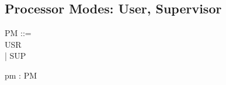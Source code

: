 \subsection{Processor Modes: User, Supervisor} %
\begin{circus}
PM ::=\\
 USR\\
 | SUP
\end{circus}

\begin{circus}
\circchannel pm : PM
\end{circus}
